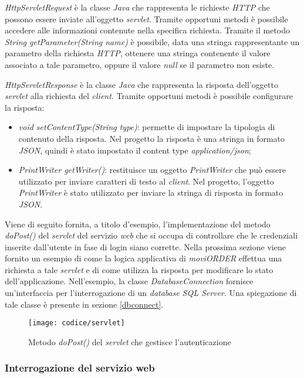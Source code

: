 \textit{HttpServletRequest} è la classe \textit{Java} che rappresenta le richieste \textit{HTTP} che possono essere inviate all'oggetto \textit{servlet}. Tramite opportuni metodi è possibile accedere alle informazioni contenute nella specifica richiesta. Tramite il metodo \textit{String getParameter(String name)} è possibile, data una stringa rappresentante un parametro della richiesta \textit{HTTP}, ottenere una stringa contenente il valore associato a tale parametro, oppure il valore \textit{null} se il parametro non esiste.

\textit{HttpServletResponse} è la classe \textit{Java} che rappresenta la risposta dell'oggetto \textit{servlet} alla richiesta del \textit{client}. Tramite opportuni metodi è possibile configurare la risposta:
\begin{itemize}
	\item \textit{void setContentType(String type)}: permette di impostare la tipologia di contenuto della risposta. Nel progetto la risposta è una stringa in formato \textit{JSON}, quindi è stato impostato il content type \textit{application/json};
	\item \textit{PrintWriter getWriter()}: restituisce un oggetto \textit{PrintWriter} che può essere utilizzato per inviare caratteri di testo al \textit{client}. Nel progetto, l'oggetto \textit{PrintWriter} è stato utilizzato per inviare la stringa di risposta in formato \textit{JSON}.
\end{itemize}

Viene di seguito fornita, a titolo d'esempio, l'implementazione del metodo \textit{doPost()} del \textit{servlet} del servizio \textit{web} che si occupa di controllare che le credenziali inserite dall'utente in fase di login siano corrette. Nella prossima sezione viene fornito un esempio di come la logica applicativa di \textit{moviORDER} effettua una richiesta a tale \textit{servlet} e di come utilizza la risposta per modificare lo stato dell'applicazione. Nell'esempio, la classe \textit{DatabaseConnection} fornisce un'interfaccia per l'interrogazione di un \textit{database} \textit{SQL Server}. Una spiegazione di tale classe è presente in sezione \ref{dbconnect}.

\begin{figure}[!h] 
    \centering 
    \texttt{[image: codice/servlet]} 
    \caption{Metodo \textit{doPost()} del \textit{servlet} che gestisce l'autenticazione}
\end{figure}

\subsubsection{Interrogazione del servizio web}

